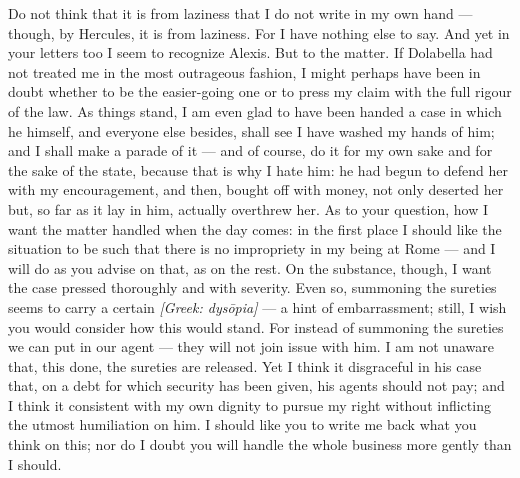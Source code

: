 

 Do not think that it is from laziness that I do not write in my own hand --- though, by Hercules, it is from laziness. For I have nothing else to say. And yet in your letters too I seem to recognize Alexis. But to the matter. If Dolabella had not treated me in the most outrageous fashion, I might perhaps have been in doubt whether to be the easier-going one or to press my claim with the full rigour of the law. As things stand, I am even glad to have been handed a case in which he himself, and everyone else besides, shall see I have washed my hands of him; and I shall make a parade of it ---  \dag{}and of course, do it for my own sake and for the sake of the state\dag{}, because that is why I hate him: he had begun to defend her with my encouragement, and then, bought off with money, not only deserted her but, so far as it lay in him, actually overthrew her. As to your question, how I want the matter handled when the day comes: in the first place I should like the situation to be such that there is no impropriety in my being at Rome --- and I will do as you advise on that, as on the rest. On the substance, though, I want the case pressed thoroughly and with severity. Even so, summoning the sureties seems to carry a certain \textit{[Greek: dysōpia]} --- a hint of embarrassment; still, I wish you would consider how this would stand. For instead of summoning the sureties we can put in our agent --- they will not join issue with him. I am not unaware that, this done, the sureties are released. Yet I think it disgraceful in his case that, on a debt for which security has been given, his agents should not pay; and I think it consistent with my own dignity to pursue my right without inflicting the utmost humiliation on him. I should like you to write me back what you think on this; nor do I doubt you will handle the whole business more gently than I should.

